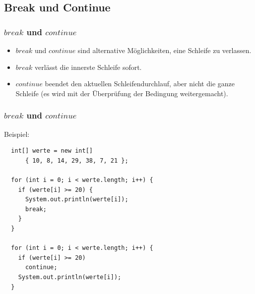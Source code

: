 \documentclass[final]{beamer}
\begin{document}
\subsection{Break und Continue}
\begin{frame}
  \frametitle{$break$ und $continue$}
  \begin{itemize}
	\item{$break$ und $continue$ sind alternative Möglichkeiten, eine Schleife zu verlassen.}
	\item{$break$ verlässt die innerste Schleife sofort.}
	\item{$continue$ beendet den aktuellen Schleifendurchlauf, aber nicht die ganze Schleife
	  (es wird mit der Überprüfung der Bedingung weitergemacht).}
  \end{itemize}
\end{frame}
\begin{frame}[containsverbatim]
  \frametitle{$break$ und $continue$}
  Beispiel:
  \begin{lstlisting}
  int[] werte = new int[]
	  { 10, 8, 14, 29, 38, 7, 21 };

  for (int i = 0; i < werte.length; i++) {
	if (werte[i] >= 20) {
	  System.out.println(werte[i]);
	  break;
	}
  }

  for (int i = 0; i < werte.length; i++) {
	if (werte[i] >= 20)
	  continue;
	System.out.println(werte[i]);
  }
  \end{lstlisting}
\end{frame}
\end{document}
